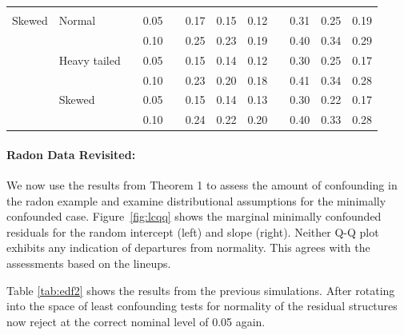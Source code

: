 \documentclass[12pt]{article} %
\begin{document}
\begin{table}[ht]
\begin{scriptsize}
\begin{center}
\begin{tabular}{ll p{.1cm} c p{.1cm} rrr p{.1cm} rrr}
             &&&&&&&&&&&\\
Skewed       & Normal       && 0.05 &&  0.17 & 0.15 & 0.12 && 0.31 & 0.25 & 0.19 \\ 
             &              && 0.10 &&  0.25 & 0.23 & 0.19 && 0.40 & 0.34 & 0.29 \\ 
             & Heavy tailed && 0.05 &&  0.15 & 0.14 & 0.12 && 0.30 & 0.25 & 0.17 \\ 
             &              && 0.10 &&  0.23 & 0.20 & 0.18 && 0.41 & 0.34 & 0.28 \\ 
             & Skewed       && 0.05 &&  0.15 & 0.14 & 0.13 && 0.30 & 0.22 & 0.17 \\ 
             &              && 0.10 &&  0.24 & 0.22 & 0.20 && 0.40 & 0.33 & 0.28 \\ 

\hline
\end{tabular}
\end{center}
\end{scriptsize}
\end{table}

\clearpage
\paragraph{Radon Data Revisited:}
We now use the results from Theorem 1 to assess the amount of confounding in the radon example and examine distributional assumptions for the minimally confounded case.
Figure~\ref{fig:lcqq} shows the marginal minimally confounded residuals for the random intercept (left) and slope (right). Neither Q-Q plot exhibits any indication of departures from normality. This agrees with the assessments based on the lineups. 

Table \ref{tab:edf2} shows the results from the previous simulations. After rotating into the space of least confounding tests for normality of the residual structures now  reject at the correct nominal level of 0.05 again.
\end{document}
